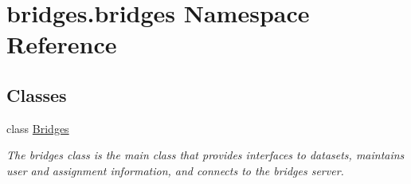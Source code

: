 \hypertarget{namespacebridges_1_1bridges}{}\section{bridges.\+bridges Namespace Reference}
\label{namespacebridges_1_1bridges}
\subsection*{Classes}
\begin{DoxyCompactItemize}
\item 
class \mbox{\hyperlink{classbridges_1_1bridges_1_1_bridges}{Bridges}}
\begin{DoxyCompactList}\small\item\em The bridges class is the main class that provides interfaces to datasets, maintains user and assignment information, and connects to the bridges server. \end{DoxyCompactList}\end{DoxyCompactItemize}
